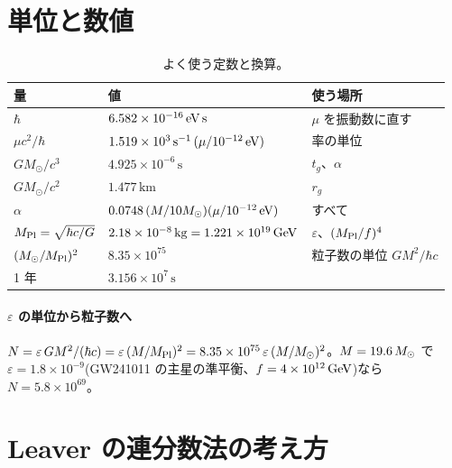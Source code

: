 \section{単位と数値}\label{app:units}

\begin{table}[H]
\centering\small
\caption{よく使う定数と換算。}
\label{tab:units}
\begin{tabular}{@{}lll@{}}
\toprule
量 & 値 & 使う場所 \\
\midrule
$\hbar$ & $6.582\times10^{-16}\,\mathrm{eV}\,\mathrm{s}$ & $\mu$ を振動数に直す \\
$\mu c^2/\hbar$ & $1.519\times10^{3}\,\mathrm{s}^{-1}\,(\mu/10^{-12}\,\mathrm{eV})$ & 率の単位 \\
$GM_\odot/c^3$ & $4.925\times10^{-6}\,\mathrm{s}$ & $t_g$、$\alpha$ \\
$GM_\odot/c^2$ & $1.477\,\mathrm{km}$ & $r_g$ \\
$\alpha$ & $0.0748\,(M/10M_\odot)(\mu/10^{-12}\,\mathrm{eV})$ & すべて \\
$M_\mathrm{Pl}=\sqrt{\hbar c/G}$ & $2.18\times10^{-8}\,\mathrm{kg}=1.221\times10^{19}\,\mathrm{GeV}$ & $\varepsilon$、$(M_\mathrm{Pl}/f)^4$ \\
$(M_\odot/M_\mathrm{Pl})^2$ & $8.35\times10^{75}$ & 粒子数の単位 $GM^2/\hbar c$ \\
1 年 & $3.156\times10^7\,\mathrm{s}$ & \\
\bottomrule
\end{tabular}
\end{table}

\paragraph{$\varepsilon$ の単位から粒子数へ}
$N=\varepsilon\,GM^2/(\hbar c)=\varepsilon\,(M/M_\mathrm{Pl})^2=8.35\times10^{75}\,\varepsilon\,(M/M_\odot)^2$。$M=19.6\,M_\odot$ で $\varepsilon=1.8\times10^{-9}$(GW241011 の主星の準平衡、$f=4\times10^{12}\,\mathrm{GeV}$)なら $N=5.8\times10^{69}$。

\section{Leaver の連分数法の考え方}\label{app:leaver}

